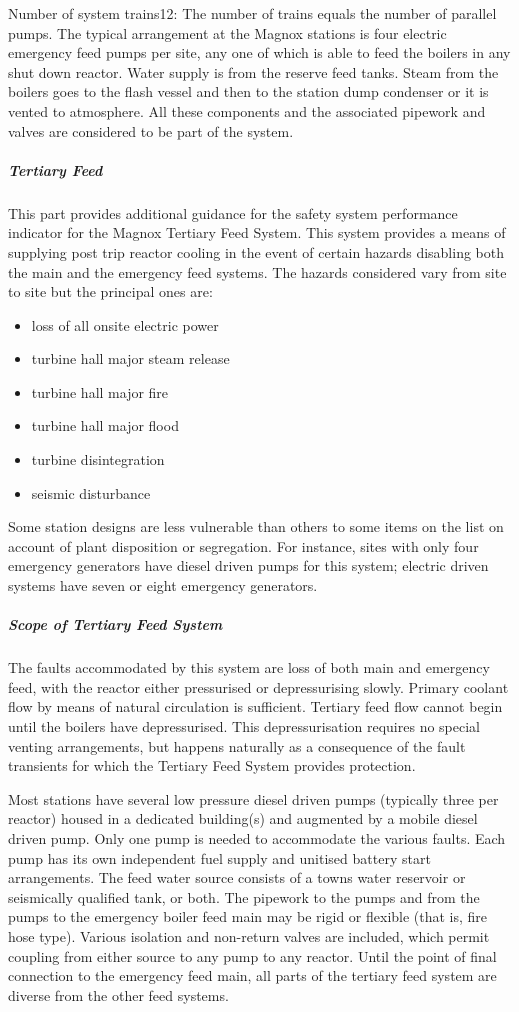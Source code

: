 Number of system trains12:  The number of trains equals the number of
parallel pumps. The typical arrangement at the Magnox stations is four
electric emergency feed pumps per site, any one of which is able to
feed the boilers in any shut down reactor. Water supply is from the
reserve feed tanks. Steam from the boilers goes to the flash vessel
and then to the station dump condenser or it is vented to
atmosphere. All these components and the associated pipework and
valves are considered to be part of the system.

\subparagraph{Tertiary Feed}

This part provides additional guidance for the safety system
performance indicator for the Magnox Tertiary Feed System. This system
provides a means of supplying post trip reactor cooling in the event
of certain hazards disabling both the main and the emergency feed
systems. The hazards considered vary from site to site but the
principal ones are:
\begin{itemize}
\item loss of all onsite electric power
\item turbine hall major steam release
\item turbine hall major fire
\item turbine hall major flood
\item turbine disintegration
\item seismic disturbance
\end{itemize}

Some station designs are less vulnerable than others to some items on
the list on account of plant disposition or segregation. For instance,
sites with only four emergency generators have diesel driven pumps for
this system; electric driven systems have seven or eight emergency
generators.

\subparagraph{Scope of Tertiary Feed System}

The faults accommodated by this system are loss of both main and
emergency feed, with the reactor either pressurised or depressurising
slowly. Primary coolant flow by means of natural circulation is
sufficient. Tertiary feed flow cannot begin until the boilers have
depressurised.  This depressurisation requires no special venting
arrangements, but happens naturally as a consequence of the fault
transients for which the Tertiary Feed System provides protection.

Most stations have several low pressure diesel driven pumps (typically
three per reactor) housed in a dedicated building(s) and augmented by
a mobile diesel driven pump. Only one pump is needed to accommodate
the various faults. Each pump has its own independent fuel supply and
unitised battery start arrangements. The feed water source consists of
a towns water reservoir or seismically qualified tank, or both. The
pipework to the pumps and from the pumps to the emergency boiler feed
main may be rigid or flexible (that is, fire hose type). Various
isolation and non-return valves are included, which permit coupling
from either source to any pump to any reactor. Until the point of
final connection to the emergency feed main, all parts of the tertiary
feed system are diverse from the other feed systems.

